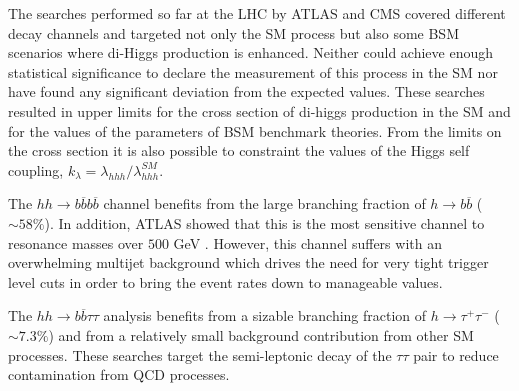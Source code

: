 %

The searches performed so far at the LHC by ATLAS and CMS covered different decay channels and targeted not only the SM process but also some BSM scenarios where di-Higgs production is enhanced. Neither could achieve enough statistical significance to declare the measurement of this process in the SM nor have found any significant deviation from the expected values. These searches resulted in upper limits for the cross section of di-higgs production in the SM and for the values of the parameters of BSM benchmark theories. From the limits on the cross section it is also possible to constraint the values of the Higgs self coupling, $k_{\lambda}=\lambda_{hhh}/\lambda_{hhh}^{SM}$.

The $hh\rightarrow b\overline{b}b\overline{b}$ channel \cite{hh2bbbbATLAS,hh2bbbbCMS} benefits from the large branching fraction of $h\rightarrow b\overline{b}$ ($\sim 58 \%$). In addition, ATLAS showed that this is the most sensitive channel to resonance masses over $500$ GeV \cite{hhATLAS}. However, this channel suffers with an overwhelming multijet background which drives the need for very tight trigger level cuts in order to bring the event rates down to manageable values.

The $hh\rightarrow b\overline{b}\tau\tau$ analysis \cite{hhbbtautau_CMS,ATLAShh2tautau} benefits from a sizable branching fraction of $h\rightarrow\tau^+\tau^-$ ($\sim 7.3\%$) and from a relatively small background contribution from other SM processes. These searches target the semi-leptonic decay of the $\tau\tau$ pair to reduce contamination from QCD processes.

